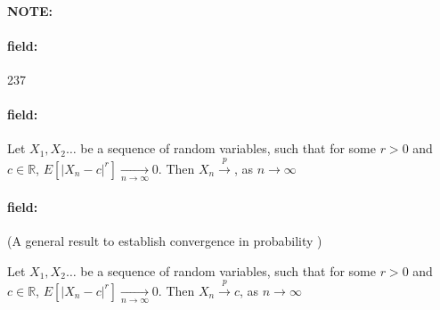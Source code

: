 \documentclass[12pt]{article}
\newenvironment{note}{\paragraph{NOTE:}}{}
\newenvironment{field}{\paragraph{field:}}{}
\begin{document}
\begin{note} \begin{field} \tiny 237 \end{field}
    \begin{field}
      Let $X_1, X_2 \ldots$ be a sequence of random variables, such that for some $r > 0$ and $c \in \mathbb{R}$, $E[|X_n - c|^r] \underset{n \to \infty}{\to} 0$. Then $X_n \overset{p}{\to} $, as $n \to \infty$
    \end{field}
    \begin{field}
      (A general result to establish convergence in probability )

      Let $X_1, X_2 \ldots$ be a sequence of random variables, such that for some $r > 0$ and $c \in \mathbb{R}$, $E[|X_n - c|^r] \underset{n \to \infty}{\to} 0$. Then $X_n \overset{p}{\to} c$, as $n \to \infty$
    \end{field}
\end{note}
\end{document}
